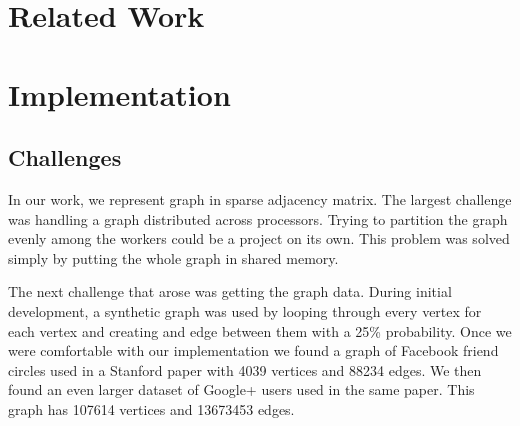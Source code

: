 \documentclass[11pt,a4paper,twocolumn,titlepage]{article}
\begin{document}



\section{Related Work} %
\label{sec:related-work}




\section{Implementation} %
\label{sec:data}


\subsection{Challenges}

In our work, we represent graph in sparse adjacency matrix. 
The largest challenge was handling a graph distributed across processors.
Trying to partition the graph evenly among the workers could be a project on
its own. This problem was solved simply by putting the whole graph in shared
memory.

The next challenge that arose was getting the graph data. During initial
development, a synthetic graph was used by looping through every vertex for
each vertex and creating and edge between them with a 25\% probability. Once we
were comfortable with our implementation we found a graph of Facebook friend
circles used in a Stanford paper \cite{leskovec2012learning} with 4039 vertices
and 88234 edges. We then found an even larger dataset of Google+ users used in
the same paper. This graph has 107614 vertices and 13673453 edges.
\end{document}
